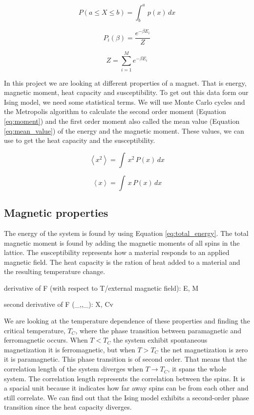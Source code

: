 \begin{equation}\label{eq:probability_density}
P(a\leq X \leq b) = \int_b^a\, p(x)\, dx
\end{equation}

\begin{equation}\label{eq:Boltzmann}
P_i(\beta) = \frac{e^{-\beta E_i}}{Z}
\end{equation}

\begin{equation}\label{eq:Partitionfunction}
Z = \sum_{i=1}^M e^{-\beta E_i}
\end{equation}

In this project we are looking at different properties of a magnet. That is energy, magnetic moment, heat capacity and susceptibility. To get out this data form our Ising model, we need some statistical terms. We will use Monte Carlo cycles and the Metropolis algorithm to calculate the second order moment (Equation \ref{eq:moment}) and the first order moment also called the mean value (Equation \ref{eq:mean_value}) of the energy and the magnetic moment. These values, we can use to get the heat capacity and the susceptibility.

\begin{equation}\label{eq:moment}
\left< x^2 \right> = \int \,x^2 \,P(x)\,dx
\end{equation}

\begin{equation}\label{eq:mean_value}
\left< x \right> = \int \,x \,P(x)\,dx
\end{equation}

\subsection{Magnetic properties}

The energy of the system is found by using Equation \ref{eq:total_energy}. The total magnetic moment is found by adding the magnetic moments of all spins in the lattice. The susceptibility represents how a material responds to an applied magnetic field. The heat capacity is the ration of heat added to a material and the resulting temperature change. 

derivative of F (with respect to T/external magnetic field): E, M

second derivative of F (\_,,\_): X, Cv

We are looking at the temperature dependence of these properties and finding the critical temperature, $T_C$,  where the phase transition between paramagnetic and ferromagnetic occurs. When $T< T_C$ the system exhibit spontaneous magnetization it is ferromagnetic, but when $T > T_C$ the net magnetization is zero it is paramagnetic. This phase transition is of second order. That means that the correlation length of the system diverges when $T \rightarrow T_C$, it spans the whole system. The correlation length represents the correlation between the spins. It is a spacial unit because it indicates how far away spins can be from each other and still correlate. We can find out that the Ising model exhibits a second-order phase transition since the heat capacity diverges.


